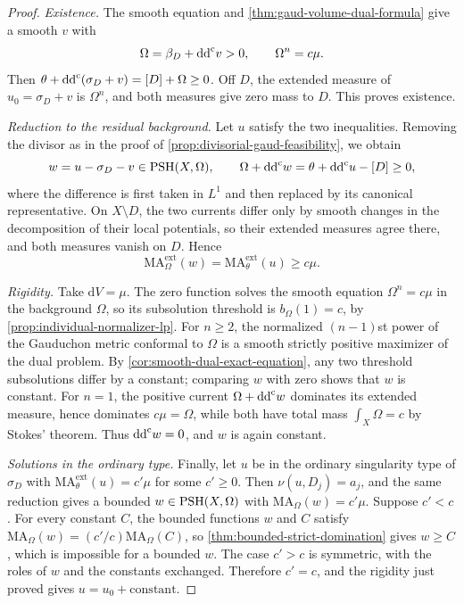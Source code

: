 \begin{proof}
\emph{Existence.} The smooth equation and \cref{thm:gaud-volume-dual-formula} give a smooth $v$ with
\[
 \Omega=\beta_D+\mathrm{dd}^{\mathrm{c}} v>0,\qquad \Omega^n=c\mu.
\]
Then $\theta+\mathrm{dd}^{\mathrm{c}}(\sigma_D+v)=[D]+\Omega\geq0$. Off $D$, the extended measure of $u_0=\sigma_D+v$ is $\Omega^n$, and both measures give zero mass to $D$. This proves existence.

\emph{Reduction to the residual background.} Let $u$ satisfy the two inequalities. Removing the divisor as in the proof of \cref{prop:divisorial-gaud-feasibility}, we obtain
\[
 w=u-\sigma_D-v\in\mathrm{PSH}(X,\Omega),\qquad
 \Omega+\mathrm{dd}^{\mathrm{c}} w=\theta+\mathrm{dd}^{\mathrm{c}} u-[D]\geq0,
\]
where the difference is first taken in $L^1$ and then replaced by its canonical representative. On $X\setminus D$, the two currents differ only by smooth changes in the decomposition of their local potentials, so their extended measures agree there, and both measures vanish on $D$. Hence
\[
 \mathrm{MA}^{\mathrm{ext}}_\Omega(w)
       =\mathrm{MA}^{\mathrm{ext}}_\theta(u)\geq c\mu.
\]

\emph{Rigidity.} Take $\mathrm{d}V=\mu$. The zero function solves the smooth equation $\Omega^n=c\mu$ in the background $\Omega$, so its subsolution threshold is $b_\Omega(1)=c$, by \cref{prop:individual-normalizer-lp}. For $n\geq2$, the normalized $(n-1)$st power of the Gauduchon metric conformal to $\Omega$ is a smooth strictly positive maximizer of the dual problem. By \cref{cor:smooth-dual-exact-equation}, any two threshold subsolutions differ by a constant; comparing $w$ with zero shows that $w$ is constant. For $n=1$, the positive current $\Omega+\mathrm{dd}^{\mathrm{c}} w$ dominates its extended measure, hence dominates $c\mu=\Omega$, while both have total mass $\int_X\Omega=c$ by Stokes' theorem. Thus $\mathrm{dd}^{\mathrm{c}} w=0$, and $w$ is again constant.

\emph{Solutions in the ordinary type.} Finally, let $u$ be in the ordinary singularity type of $\sigma_D$ with $\mathrm{MA}^{\mathrm{ext}}_\theta(u)=c'\mu$ for some $c'\geq0$. Then $\nu(u,D_j)=a_j$, and the same reduction gives a bounded $w\in\mathrm{PSH}(X,\Omega)$ with $\mathrm{MA}_\Omega(w)=c'\mu$. Suppose $c'<c$. For every constant $C$, the bounded functions $w$ and $C$ satisfy $\mathrm{MA}_\Omega(w)=(c'/c)\mathrm{MA}_\Omega(C)$, so \cref{thm:bounded-strict-domination} gives $w\geq C$, which is impossible for a bounded $w$. The case $c'>c$ is symmetric, with the roles of $w$ and the constants exchanged. Therefore $c'=c$, and the rigidity just proved gives $u=u_0+\mathrm{constant}$.
\end{proof}
